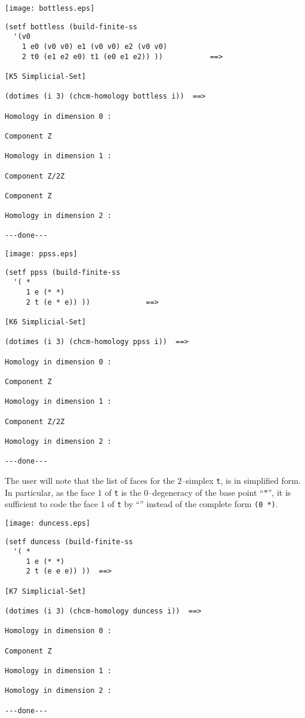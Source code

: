 \centerline{\texttt{[image: bottless.eps]}}
\vskip 0.40cm
%
{\footnotesize\begin{verbatim}
(setf bottless (build-finite-ss
  '(v0
    1 e0 (v0 v0) e1 (v0 v0) e2 (v0 v0)
    2 t0 (e1 e2 e0) t1 (e0 e1 e2)) ))           ==>

[K5 Simplicial-Set]

(dotimes (i 3) (chcm-homology bottless i))  ==>

Homology in dimension 0 :

Component Z

Homology in dimension 1 :

Component Z/2Z

Component Z

Homology in dimension 2 :

---done---
\end{verbatim}}
\newpage
%
\vskip 0.40cm
\centerline{\texttt{[image: ppss.eps]}}
\vskip 0.40cm
%
{\footnotesize\begin{verbatim}
(setf ppss (build-finite-ss
  '( *
     1 e (* *)
     2 t (e * e)) ))             ==>

[K6 Simplicial-Set]

(dotimes (i 3) (chcm-homology ppss i))  ==>

Homology in dimension 0 :

Component Z

Homology in dimension 1 :

Component Z/2Z

Homology in dimension 2 :

---done---
\end{verbatim}}
The user will note that the list of faces for the $2$--simplex {\tt t}, is
in simplified form. In particular, as the face $1$ of {\tt t} is the $0$--degeneracy
of the base point ``$*$'', it is sufficient to code the  face $1$ of {\tt t}
by ``{\tt *}'' instead of the complete form {\tt (0 *)}.
\newpage
%
\vskip 0.40cm
\centerline{\texttt{[image: duncess.eps]}}
\vskip 0.40cm
%
{\footnotesize\begin{verbatim}
(setf duncess (build-finite-ss
  '( *
     1 e (* *)
     2 t (e e e)) ))  ==>

[K7 Simplicial-Set]

(dotimes (i 3) (chcm-homology duncess i))  ==>

Homology in dimension 0 :

Component Z

Homology in dimension 1 :

Homology in dimension 2 :

---done---
\end{verbatim}}
\newpage

